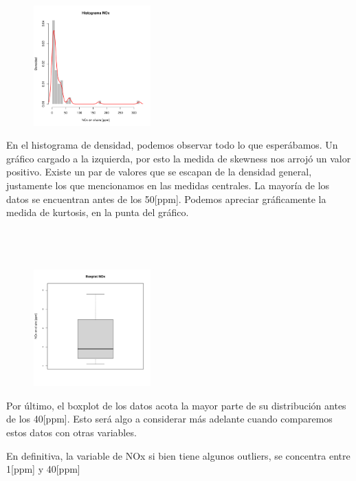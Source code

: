\documentclass[11pt]{article}
\begin{document}
\begin{figure}
    \centering
    \includegraphics[width = 0.4\textwidth]{histnox}
\end{figure}

En el histograma de densidad, podemos observar todo lo que esperábamos. Un gráfico cargado a la izquierda, por esto la medida de skewness nos arrojó un valor positivo. Existe un par de valores que se escapan de la densidad general, justamente los que mencionamos en las medidas centrales. La mayoría de los datos se encuentran antes de los 50[ppm]. Podemos apreciar gráficamente la medida de kurtosis, en la punta del gráfico. 
\\
\\
\\
\\

\begin{figure}
    \centering
    \includegraphics[width = 0.4\textwidth]{boxnox}
\end{figure}

Por último, el boxplot de los datos acota la mayor parte de su distribución antes de los 40[ppm]. Esto será algo a considerar más adelante cuando comparemos estos datos con otras variables. 

En definitiva, la variable de NOx si bien tiene algunos outliers, se concentra entre 1[ppm] y 40[ppm]
\\
\\
\\
\\
\\
\\
\end{document}
